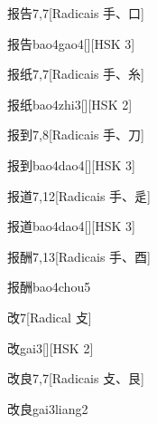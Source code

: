 \begin{entry}{报告}{7,7}[Radicais ⼿、⼝]
  \begin{phonetics}{报告}{bao4gao4}[][HSK 3]
  \end{phonetics}
\end{entry}

\begin{entry}{报纸}{7,7}[Radicais ⼿、⽷]
  \begin{phonetics}{报纸}{bao4zhi3}[][HSK 2]
  \end{phonetics}
\end{entry}

\begin{entry}{报到}{7,8}[Radicais ⼿、⼑]
  \begin{phonetics}{报到}{bao4dao4}[][HSK 3]
  \end{phonetics}
\end{entry}

\begin{entry}{报道}{7,12}[Radicais ⼿、⾡]
  \begin{phonetics}{报道}{bao4dao4}[][HSK 3]
  \end{phonetics}
\end{entry}

\begin{entry}{报酬}{7,13}[Radicais ⼿、⾣]
  \begin{phonetics}{报酬}{bao4chou5}
  \end{phonetics}
\end{entry}

\begin{entry}{改}{7}[Radical ⽁]
  \begin{phonetics}{改}{gai3}[][HSK 2]
  \end{phonetics}
\end{entry}

\begin{entry}{改良}{7,7}[Radicais ⽁、⾉]
  \begin{phonetics}{改良}{gai3liang2}
  \end{phonetics}
\end{entry}

